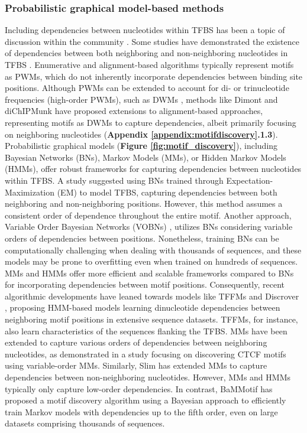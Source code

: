 \documentclass[a4paper, titlepage, openright]{book}
\begin{document}
\subsubsection{Probabilistic graphical model-based methods}
Including dependencies between nucleotides within TFBS has been a topic of discussion within the community \citep{tomovic2007position,morris2011jury,zhao2011quantitative}. Some studies have demonstrated the existence of dependencies between both neighboring and non-neighboring nucleotides in TFBS \citep{slattery2014absence,rohs2010origins}. Enumerative and alignment-based algorithms typically represent motifs as PWMs, which do not inherently incorporate dependencies between binding site positions. Although PWMs can be extended to account for di- or trinucleotide frequencies (high-order PWMs), such as DWMs \citep{siddharthan2010dinucleotide}, methods like Dimont \citep{grau2013general} and diChIPMunk \citep{kulakovskiy2013binding} have proposed extensions to alignment-based approaches, representing motifs as DWMs to capture dependencies, albeit primarily focusing on neighboring nucleotides (\textbf{Appendix \ref{appendix:motifdiscovery}.1.3}). Probabilistic graphical models (\textbf{Figure \ref{fig:motif_discovery}}), including Bayesian Networks (BNs), Markov Models (MMs), or Hidden Markov Models (HMMs), offer robust frameworks for capturing dependencies between nucleotides within TFBS. A study \citep{barash2003modeling} suggested using BNs trained through Expectation-Maximization (EM) to model TFBS, capturing dependencies between both neighboring and non-neighboring positions. However, this method assumes a consistent order of dependence throughout the entire motif. Another approach, Variable Order Bayesian Networks (VOBNs) \citep{ben2005identification}, utilizes BNs considering variable orders of dependencies between positions. Nonetheless, training BNs can be computationally challenging when dealing with thousands of sequences, and these models may be prone to overfitting even when trained on hundreds of sequences. MMs and HMMs offer more efficient and scalable frameworks compared to BNs for incorporating dependencies between motif positions. Consequently, recent algorithmic developments have leaned towards models like TFFMs \citep{mathelier2013next} and Discrover \citep{maaskola2014binding}, proposing HMM-based models learning dinucleotide dependencies between neighboring motif positions in extensive sequence datasets. TFFMs, for instance, also learn characteristics of the sequences flanking the TFBS. MMs have been extended to capture various orders of dependencies between neighboring nucleotides, as demonstrated in a study \citep{eggeling2014value} focusing on discovering CTCF \citep{bell1999protein} motifs using variable-order MMs. Similarly, Slim \citep{keilwagen2015varying} has extended MMs to capture dependencies between non-neighboring nucleotides. However, MMs and HMMs typically only capture low-order dependencies. In contrast, BaMMotif \citep{siebert2016bayesian,ge2021bayesian} has proposed a motif discovery algorithm using a Bayesian approach to efficiently train Markov models with dependencies up to the fifth order, even on large datasets comprising thousands of sequences.
\end{document}
